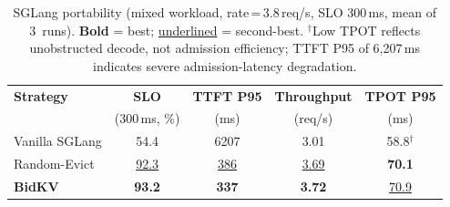 \begin{table}[t]
\centering
\caption{SGLang portability (mixed workload, rate\,=\,3.8\,req/s,
  SLO 300\,ms, mean of 3~runs).
  \textbf{Bold} = best; \underline{underlined} = second-best.
  $^\dagger$Low TPOT reflects unobstructed decode, not admission efficiency;
  TTFT P95 of 6{,}207\,ms indicates severe admission-latency degradation.}
\label{tab:sglang}
\footnotesize
\begin{tabular}{@{}l c c c c@{}}
\toprule
\textbf{Strategy} & \textbf{SLO}
  & \textbf{TTFT P95} & \textbf{Throughput} & \textbf{TPOT P95} \\
  & (300\,ms, \%) & (ms) & (req/s) & (ms) \\
\midrule
Vanilla SGLang    & 54.4 & 6207 & 3.01 & 58.8$^\dagger$ \\
Random-Evict      & \underline{92.3} & \underline{386} & \underline{3.69} & \textbf{70.1} \\
\textbf{BidKV}    & \textbf{93.2} & \textbf{337} & \textbf{3.72} & \underline{70.9} \\
\bottomrule
\end{tabular}
\end{table}
